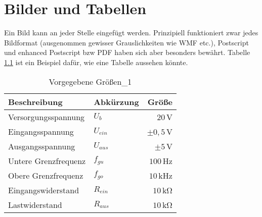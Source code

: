 \chapter{Bilder und Tabellen}

Ein Bild kann an jeder Stelle eingefügt werden. Prinzipiell funktioniert zwar jedes Bildformat (ausgenommen gewisser Grauslichkeiten wie WMF etc.), Postscript und enhanced Postscript bzw PDF haben sich aber besonders bewährt. Tabelle \ref{tab: Vorgegebene Größen_1} ist ein Beispiel dafür, wie eine Tabelle aussehen könnte.

\begin{table}[htp]
	\centering
	\caption[Vorgegebene Größen\_1]{Vorgegebene Größen\_1}
	\label{tab: Vorgegebene Größen_1}
	\footnotesize
		\begin{tabular}{l l r}
			\toprule
			Beschreibung & Abkürzung & Größe \\
			\midrule
			Versorgungsspannung & $U_b$ & $20$\,\si{\volt}\\
			Eingangsspannung & $U_{ein}$ & $\pm0,5$\,\si{\volt}\\
			Ausgangsspannung & $U_{aus}$ & $\pm5$\,\si{\volt}\\
			Untere Grenzfrequenz & $f_{gu}$ & $100$\,\si{\hertz}\\
			Obere Grenzfrequenz & $f_{go}$ & $10$\,\si{\kilo\hertz}\\
			Eingangswiderstand & $R_{ein}$ & $10$\,\si{\kilo\ohm}\\
			Lastwiderstand & $R_{aus}$ & $10$\,\si{\kilo\ohm}\\
			\bottomrule
		\end{tabular}
\end{table}




